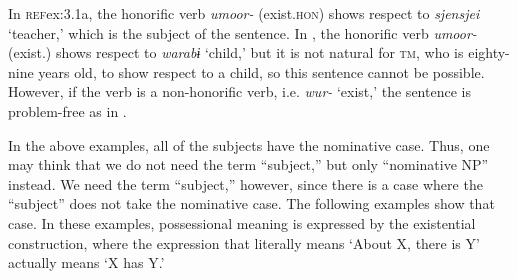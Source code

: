 In \textsc{ref}{ex:3.1a}, the honorific verb \textit{umoor-} (exist.\textsc{hon}) shows respect to \textit{sjensjei} ‘teacher,’ which is the subject of the sentence. In , the honorific verb \textit{umoor-} (exist.\HON) shows respect to \textit{warabɨ} ‘child,’ but it is not natural for \textsc{tm}, who is eighty-nine years old, to show respect to a child, so this sentence cannot be possible. However, if the verb is a non-honorific verb, i.e. \textit{wur-} ‘exist,’ the sentence is problem-free as in .

In the above examples, all of the subjects have the nominative case. Thus, one may think that we do not need the term “subject,” but only “nominative NP” instead. We need the term “subject,” however, since there is a case where the “subject” does not take the nominative case. The following examples show that case. In these examples, possessional meaning is expressed by the existential construction, where the expression that literally means ‘About X, there is Y’ actually means ‘X has Y.’

